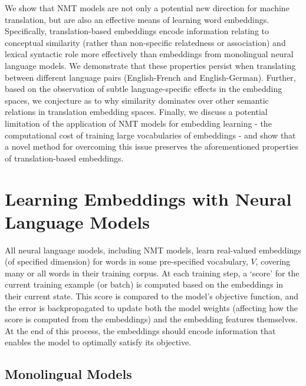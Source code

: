 We show that NMT models are not only a potential new direction for machine translation, but are also an effective means of learning word embeddings. Specifically, translation-based embeddings encode information relating to conceptual similarity (rather than non-specific relatedness or association) and lexical syntactic role more effectively than embeddings from monolingual neural language models. We demonstrate that these properties persist when translating between different language pairs (English-French and English-German). Further, based on the observation of subtle language-specific effects in the embedding spaces, we conjecture as to why similarity dominates over other semantic relations in translation embedding spaces. Finally, we discuss a potential limitation of the application of NMT models for embedding learning - the computational cost of training large vocabularies of embeddings - and show that a novel method for overcoming this issue preserves the aforementioned properties of translation-based embeddings. 


\section{Learning Embeddings with Neural Language Models}

All neural language models, including NMT models, learn real-valued embeddings (of specified dimension) for words in some pre-specified vocabulary, \(V\), covering many or all words in their training corpus. At each training step, a `score' for the current training example (or batch) is computed based on the embeddings in their current state. This score is compared to the model's objective function, and the error is backpropagated to update both the model weights (affecting how the score is computed from the embeddings) and the embedding features themselves. At the end of this process, the embeddings should encode information that enables the model to optimally satisfy its objective.     

\subsection{Monolingual Models}

